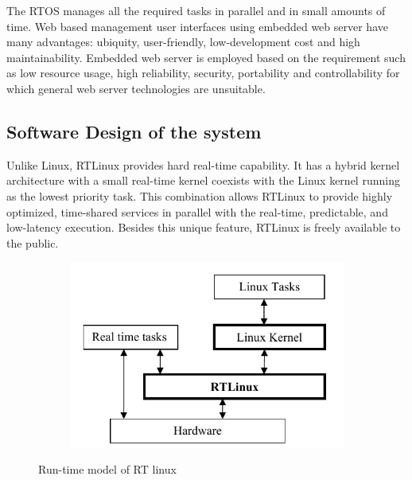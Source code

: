 \documentclass{FR16}
\begin{document}
The RTOS manages all the required tasks in parallel and in small amounts of time. Web based management
user interfaces using embedded web server have many advantages: ubiquity, user-friendly, low-development cost
and high maintainability. Embedded web server is employed based on the  requirement such as low resource usage, high
reliability, security, portability and controllability for which general web server technologies are unsuitable.


\subsection{Software Design of the system}
Unlike Linux, RTLinux provides hard real-time capability. It has a hybrid kernel architecture with a small real-time
kernel coexists with the Linux kernel running as the lowest priority task. This combination allows RTLinux to
provide highly optimized, time-shared services in parallel with the real-time, predictable, and low-latency execution.
Besides this unique feature, RTLinux is freely available to the public. 
 

  \begin{figure}[H]
 
    \begin{subfigure}{\textwidth}
    \includegraphics[scale=0.8]{rtlinux.png} 
    \label{fig:DJp1}
    \end{subfigure}
 
 \caption{Run-time model of RT linux}
\label{fig6}
\end{figure}
\end{document}
